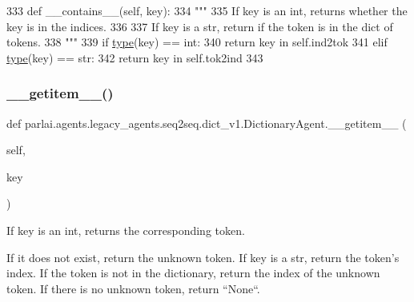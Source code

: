 \begin{DoxyCode}
333     \textcolor{keyword}{def }\_\_contains\_\_(self, key):
334         \textcolor{stringliteral}{"""}
335 \textcolor{stringliteral}{        If key is an int, returns whether the key is in the indices.}
336 \textcolor{stringliteral}{}
337 \textcolor{stringliteral}{        If key is a str, return if the token is in the dict of tokens.}
338 \textcolor{stringliteral}{        """}
339         \textcolor{keywordflow}{if} \hyperlink{namespaceparlai_1_1agents_1_1tfidf__retriever_1_1build__tfidf_ad5dfae268e23f506da084a9efb72f619}{type}(key) == int:
340             \textcolor{keywordflow}{return} key \textcolor{keywordflow}{in} self.ind2tok
341         \textcolor{keywordflow}{elif} \hyperlink{namespaceparlai_1_1agents_1_1tfidf__retriever_1_1build__tfidf_ad5dfae268e23f506da084a9efb72f619}{type}(key) == str:
342             \textcolor{keywordflow}{return} key \textcolor{keywordflow}{in} self.tok2ind
343 
\end{DoxyCode}
\mbox{\label{classparlai_1_1agents_1_1legacy__agents_1_1seq2seq_1_1dict__v1_1_1DictionaryAgent_ab9926717ef35f03f16f1329f8ae8edc0}} 
\subsubsection{\texorpdfstring{\+\_\+\+\_\+getitem\+\_\+\+\_\+()}{\_\_getitem\_\_()}}
{\footnotesize\ttfamily def parlai.\+agents.\+legacy\+\_\+agents.\+seq2seq.\+dict\+\_\+v1.\+Dictionary\+Agent.\+\_\+\+\_\+getitem\+\_\+\+\_\+ (\begin{DoxyParamCaption}\item[{}]{self,  }\item[{}]{key }\end{DoxyParamCaption})}

\begin{DoxyVerb}If key is an int, returns the corresponding token.

If it does not exist, return the unknown token. If key is a str, return the
token's index. If the token is not in the dictionary, return the index of the
unknown token. If there is no unknown token, return ``None``.
\end{DoxyVerb}
 

